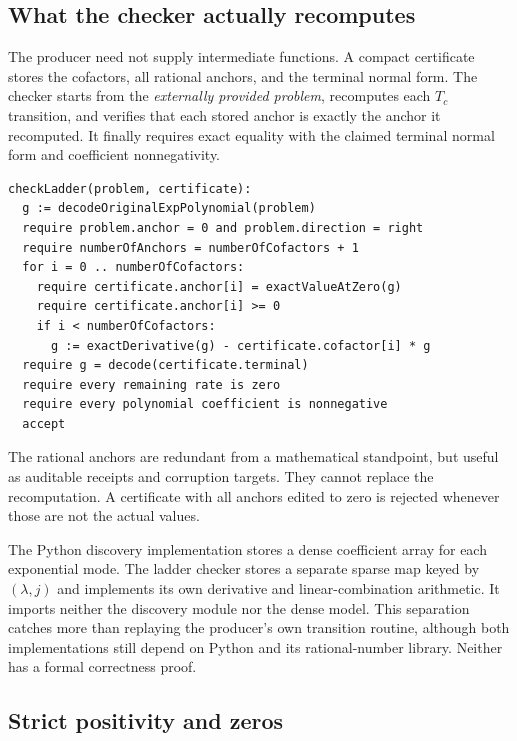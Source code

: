 \subsection{What the checker actually recomputes}

The producer need not supply intermediate functions. A compact certificate stores the cofactors, all rational anchors, and the terminal normal form. The checker starts from the \emph{externally provided problem}, recomputes each $T_c$ transition, and verifies that each stored anchor is exactly the anchor it recomputed. It finally requires exact equality with the claimed terminal normal form and coefficient nonnegativity.

\par\noindent\begin{minipage}{\textwidth}
\begin{lstlisting}
checkLadder(problem, certificate):
  g := decodeOriginalExpPolynomial(problem)
  require problem.anchor = 0 and problem.direction = right
  require numberOfAnchors = numberOfCofactors + 1
  for i = 0 .. numberOfCofactors:
    require certificate.anchor[i] = exactValueAtZero(g)
    require certificate.anchor[i] >= 0
    if i < numberOfCofactors:
      g := exactDerivative(g) - certificate.cofactor[i] * g
  require g = decode(certificate.terminal)
  require every remaining rate is zero
  require every polynomial coefficient is nonnegative
  accept
\end{lstlisting}
\end{minipage}\par

The rational anchors are redundant from a mathematical standpoint, but useful as auditable receipts and corruption targets. They cannot replace the recomputation. A certificate with all anchors edited to zero is rejected whenever those are not the actual values.

The Python discovery implementation stores a dense coefficient array for each exponential mode. The ladder checker stores a separate sparse map keyed by $(\lambda,j)$ and implements its own derivative and linear-combination arithmetic. It imports neither the discovery module nor the dense model. This separation catches more than replaying the producer's own transition routine, although both implementations still depend on Python and its rational-number library. Neither has a formal correctness proof.

\subsection{Strict positivity and zeros}

